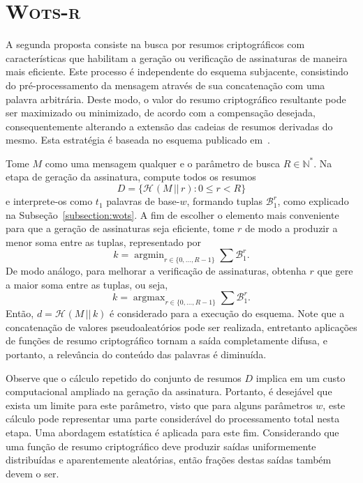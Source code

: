 \documentclass{ufsctex/ufsctex}
\newcommand{\bone}{\mathcal{B}_{1}}
\newcommand{\hash}[2][]{\mathcal{H}^{#1} (#2)}
\newcommand{\concat}{\, \vert{} \vert{} \,}
\newcommand{\wotsr}{\textsc{Wots-r}}
\DeclareMathOperator*{\argmin}{argmin}
\DeclareMathOperator*{\argmax}{argmax}
\begin{document}
\section{\wotsr{}}\label{section:wotsr}

A segunda proposta consiste na busca por resumos criptográficos com
características que habilitam a geração ou verificação de assinaturas de
maneira mais eficiente. Este processo é independente do esquema subjacente,
consistindo do pré-processamento da mensagem através de sua concatenação com
uma palavra arbitrária. Deste modo, o valor do resumo criptográfico
resultante pode ser maximizado ou minimizado, de acordo com a compensação
desejada, consequentemente alterando a extensão das cadeias de resumos
derivadas do mesmo. Esta estratégia é baseada no esquema publicado
em~\cite{Steinwandt:article:2008:oct}.

Tome $M$ como uma mensagem qualquer e o parâmetro de busca $R \in
\mathbb{N}^{*}$. Na etapa de geração da assinatura, compute todos os resumos
\begin{equation}
  D = \{\hash{M \concat r} : 0 \leq r < R\}
\end{equation}
e interprete-os como $t_{1}$ palavras de base-$w$, formando tuplas $\bone^{r}$,
como explicado na Subseção~\ref{subsection:wots}. A fim de escolher o
elemento mais conveniente para que a geração de assinaturas seja eficiente,
tome $r$ de modo a produzir a menor soma entre as tuplas, representado por
\begin{equation}
  k = \argmin_{r \in \{0, \dots, R - 1\}} \sum \bone^{r}.
\end{equation}
De modo análogo, para melhorar a verificação de assinaturas, obtenha $r$ que
gere a maior soma entre as tuplas, ou seja,
\begin{equation}
  k = \argmax_{r \in \{0, \dots, R - 1\}} \sum \bone^{r}.
\end{equation}
Então, $d = \hash{M \concat k}$ é considerado para a execução do esquema. Note
que a concatenação de valores pseudoaleatórios pode ser realizada, entretanto
aplicações de funções de resumo criptográfico tornam a saída completamente
difusa, e portanto, a relevância do conteúdo das palavras é diminuída.

Observe que o cálculo repetido do conjunto de resumos $D$ implica em um custo
computacional ampliado na geração da assinatura. Portanto, é desejável que
exista um limite para este parâmetro, visto que para alguns parâmetros $w$,
este cálculo pode representar uma parte considerável do processamento total
nesta etapa. Uma abordagem estatística é aplicada para este fim. Considerando
que uma função de resumo criptográfico deve produzir saídas uniformemente
distribuídas e aparentemente aleatórias, então frações destas saídas também
devem o ser.
\end{document}
